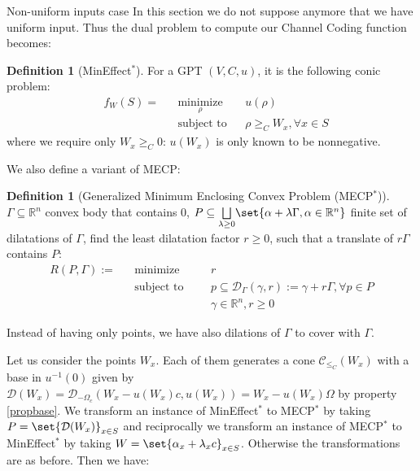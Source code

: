 \documentclass{article}
\theoremstyle{definition}
\newtheorem{defi}[theo]{Definition}
\theoremstyle{remark}
\DeclareMathOperator{\mini}{\text{minimize}}
\DeclareMathOperator{\st}{\text{subject to}}
\begin{document}
\begin{subsubsection}{Non-uniform inputs case}
  In this section we do not suppose anymore that we have uniform input. Thus the dual problem to compute our Channel Coding function becomes:
  \begin{defi}[MinEffect$^*$]
    For a GPT $(V,C,u)$, it is the following conic problem:
    \begin{equation}
    \begin{aligned}
      &f_W(S) =&& \underset{\rho}{\mini} && u(\rho) \\
      &&& \st && \rho \geq_C  W_x, \forall x \in S
      \end{aligned}
    \end{equation}
    where we require only $W_x \geq_C 0$: $u(W_x)$ is only known to be nonnegative.
  \end{defi}

  We also define a variant of MECP:
  \begin{defi}[Generalized Minimum Enclosing Convex Problem (MECP$^*$)]
  $\Gamma \subseteq \mathbb{R}^n$ convex body that contains $0$, $P \subseteq \underset{\lambda \geq 0}{\bigsqcup}\set{\alpha + \lambda\Gamma,  \alpha \in \mathbb{R}^n}$ finite set of dilatations of $\Gamma$,  find the least dilatation factor $r \geq 0$, such that a translate of $r\Gamma$ contains $P$:
    \begin{equation}
    \begin{aligned}
      R(P,\Gamma) := && \mini &&& r\\
      && \st &&& p \subseteq \mathcal{D}_{\Gamma}(\gamma,r) := \gamma + r\Gamma, \forall p \in P\\
      && &&& \gamma \in \mathbb{R}^n, r \geq 0
    \end{aligned}
  \end{equation}
  \end{defi}

  Instead of having only points, we have also dilations of $\Gamma$ to cover with $\Gamma$.
  
  Let us consider the points $W_x$. Each of them generates a cone $\mathcal{C}_{\leq_C}(W_x)$ with a base in $u^{-1}(0)$ given by $\mathcal{D}(W_x)=\mathcal{D}_{-\Omega_c}(W_x - u(W_x)c ,u(W_x)) = W_x - u(W_x)\Omega$ by property \ref{propbase}. We transform an instance of MinEffect$^*$ to MECP$^*$ by taking $P = \set{\mathcal{D}(W_x)}_{x \in S}$ and reciprocally we transform an instance of MECP$^*$ to MinEffect$^*$ by taking $W = \set{\alpha_x +\lambda_x c}_{x \in S}$. Otherwise the transformations are as before. Then we have:
  

\end{subsubsection}
\end{document}
